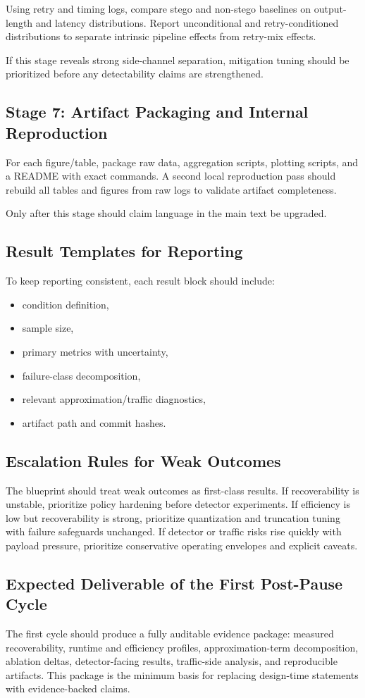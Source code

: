 Using retry and timing logs, compare stego and non-stego baselines on output-length and latency distributions. Report unconditional and retry-conditioned distributions to separate intrinsic pipeline effects from retry-mix effects.

If this stage reveals strong side-channel separation, mitigation tuning should be prioritized before any detectability claims are strengthened.

\subsection{Stage 7: Artifact Packaging and Internal Reproduction}

For each figure/table, package raw data, aggregation scripts, plotting scripts, and a README with exact commands. A second local reproduction pass should rebuild all tables and figures from raw logs to validate artifact completeness.

Only after this stage should claim language in the main text be upgraded.

\subsection{Result Templates for Reporting}

To keep reporting consistent, each result block should include:
\begin{itemize}
\item condition definition,
\item sample size,
\item primary metrics with uncertainty,
\item failure-class decomposition,
\item relevant approximation/traffic diagnostics,
\item artifact path and commit hashes.
\end{itemize}

\subsection{Escalation Rules for Weak Outcomes}

The blueprint should treat weak outcomes as first-class results.
If recoverability is unstable, prioritize policy hardening before detector experiments.
If efficiency is low but recoverability is strong, prioritize quantization and truncation tuning with failure safeguards unchanged.
If detector or traffic risks rise quickly with payload pressure, prioritize conservative operating envelopes and explicit caveats.

\subsection{Expected Deliverable of the First Post-Pause Cycle}

The first cycle should produce a fully auditable evidence package: measured recoverability, runtime and efficiency profiles, approximation-term decomposition, ablation deltas, detector-facing results, traffic-side analysis, and reproducible artifacts. This package is the minimum basis for replacing design-time statements with evidence-backed claims.
